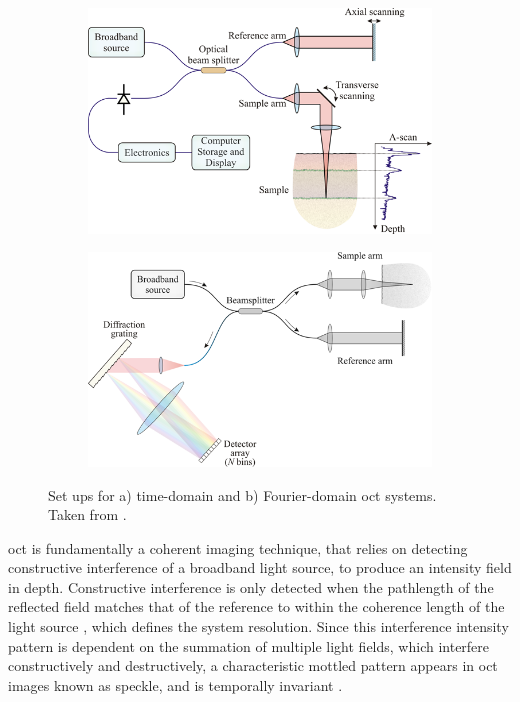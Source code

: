 \begin{figure}
	\centering
    \begin{subfigure}{0.49\textwidth}
    	\centering
        \includegraphics[width=\textwidth]{bground_figs/time_domain}
    \end{subfigure}
    \quad
    \begin{subfigure}{0.49\textwidth}
    	\centering
        \includegraphics[width=\textwidth]{bground_figs/fourier_domain.png}
    \end{subfigure}
	\caption{Set ups for a) time-domain and b) Fourier-domain \ac{oct} systems. Taken from \cite{optical+biomedical_engineering_laboratory_introduction_nodate}.}
    \label{oct_domains}	
\end{figure}

\ac{oct} is fundamentally a coherent imaging technique, that relies on detecting constructive interference of a broadband light source, to produce an intensity field in depth. Constructive interference is only detected when the pathlength of the reflected field matches that of the reference to within the coherence length of the light source \cite{wijesinghe_improving_2017}, which defines the system resolution. 
Since this interference intensity pattern is dependent on the summation of multiple light fields, which interfere constructively and destructively, a characteristic mottled pattern appears in \ac{oct} images known as speckle, and is temporally invariant \cite{wijesinghe_improving_2017}.

